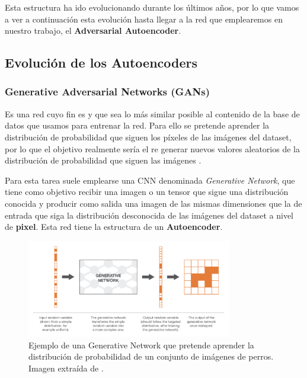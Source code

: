        \medskip 

        \noindent Esta estructura ha ido evolucionando durante los últimos años, por lo que vamos a ver a continuación esta evolución hasta llegar a la red que emplearemos en nuestro trabajo, el \textbf{Adversarial Autoencoder}.

    \subsection{Evolución de los Autoencoders}
        \subsubsection{Generative Adversarial Networks (GANs)}
            \noindent Es una red cuyo fin es  y que sea lo más similar posible al contenido de la base de datos que usamos para entrenar la red. Para ello se pretende aprender la distribución de probabilidad que siguen los píxeles de las imágenes del dataset, por lo que el objetivo realmente sería el re generar nuevos valores aleatorios de la distribución de probabilidad que siguen las imágenes \cite{GAN}. 

            \medskip

            \noindent Para esta tarea suele emplearse una CNN denominada \textit{Generative Network}, que tiene como objetivo recibir una imagen o un tensor que sigue una distribución conocida y producir como salida una imagen de las mismas dimensiones que la de entrada que siga la distribución desconocida de las imágenes del dataset a nivel de \textbf{pixel}. Esta red tiene la estructura de un \textbf{Autoencoder}.

            \begin{figure}[!h]
                \centering
                \includegraphics[width=0.8\textwidth]{img/Generative_network.png}
                \caption{Ejemplo de una Generative Network que pretende aprender la distribución de probabilidad de un conjunto de imágenes de perros. Imagen extraída de \cite{autoencoders2017}.}
                \label{fig:Generative Network}
            \end{figure}
            

